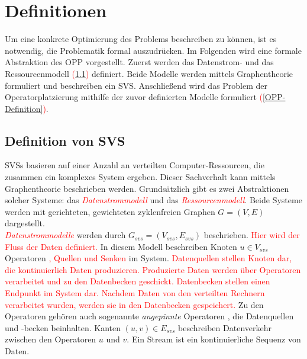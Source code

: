 \documentclass{article}
\begin{document}
\section{Definitionen}
Um eine konkrete Optimierung des Problems beschreiben zu können, ist es notwendig, die Problematik formal auszudrücken. 
Im Folgenden wird eine formale Abstraktion des OPP vorgestellt. 
Zuerst werden das Datenstrom- und das Ressourcenmodell \textcolor{red}{(}\ref{SVS-Definition}\textcolor{red}{)} definiert. 
Beide Modelle werden mittels Graphentheorie formuliert und beschreiben ein SVS. 
Anschließend wird das Problem der Operatorplatzierung mithilfe der zuvor definierten Modelle formuliert \textcolor{red}{(}\ref{OPP-Definition}\textcolor{red}{)}.


\subsection{Definition von SVS}  \label{SVS-Definition}  %
SVSs basieren auf einer Anzahl an verteilten Computer-Ressourcen, die zusammen ein komplexes System ergeben. 
Dieser Sachverhalt kann mittels Graphentheorie beschrieben werden. Grundsätzlich gibt es zwei Abstraktionen solcher Systeme:
das \textcolor{red}{\textit{Datenstrommodell}} und das \textcolor{red}{\textit{Ressourcenmodell}}. 
Beide Systeme werden mit gerichteten, gewichteten zyklenfreien Graphen $G = (V,E)$ dargestellt. \\


\textcolor{red}{\textit{Datenstrommodelle}} werden durch $G_{svs} = (V_{svs}, E_{svs})$ beschrieben. 
\textcolor{red}{Hier wird der Fluss der Daten definiert.}
In diesem Modell beschreiben Knoten $u \in V_{svs}$ Operatoren \textcolor{red}{, Quellen und Senken} im System. 
\textcolor{red}{Datenquellen stellen Knoten dar, die kontinuierlich Daten produzieren. Produzierte Daten werden über Operatoren verarbeitet und zu den Datenbecken geschickt. 
Datenbecken stellen einen Endpunkt im System dar. Nachdem Daten von den verteilten Rechnern verarbeitet wurden, werden sie in den Datenbecken gespeichert.} 
Zu den Operatoren gehören auch sogenannte \textit{angepinnte} Operatoren \cite{efficient-operator-placement}, 
die Datenquellen und -becken beinhalten. Kanten $(u,v) \in E_{svs}$ beschreiben Datenverkehr
zwischen den Operatoren $u$ und $v$.  Ein Stream ist ein kontinuierliche Sequenz von Daten. \\
\end{document}
